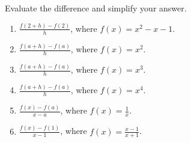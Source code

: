 Evaluate the difference and simplify your answer.
\begin{multicols}{2}
\begin{enumerate}
\item $\frac{f(2+h)-f(2)}{h}$, where $f(x)=x^2-x-1$.

\item $\frac{f(a+h)-f(a)}{h}$, where $f(x)= x^2$.

\item $\frac{f(a+h)-f(a)}{h}$, where $f(x)= x^3$.

\item $\frac{f(a+h)-f(a)}{h}$, where $f(x)= x^4$.

\item $\frac{f(x)-f(a)}{x-a}$, where $f(x)=\frac{1}{x}$.

\item $\frac{f(x)-f(1)}{x-1}$, where $f(x)=\frac{x-1}{x+1}$.
\end{enumerate}
\end{multicols}
